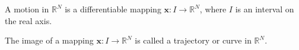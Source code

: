 A motion in $\mathbb{R}^N$ is a differentiable mapping $\mathbf{x}: I \rightarrow \mathbb{R}^N$, where $I$ is an interval on the real axis.

The image of a mapping $\mathbf{x}: I \rightarrow \mathbb{R}^N$ is called a trajectory or curve in $\mathbb{R}^N$.
